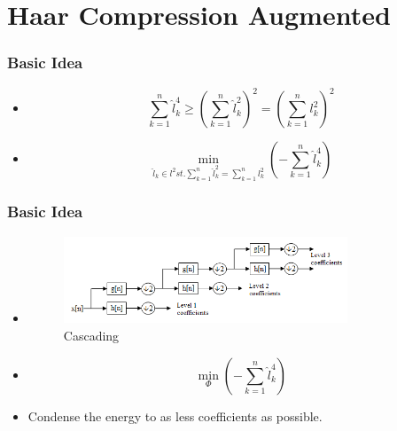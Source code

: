 \documentclass{beamer}
\begin{document}
\section{Haar Compression Augmented}
\begin{frame}
    \frametitle{Basic Idea}
    \begin{itemize}
        \item \[
                  \sum_{k=1}^{n}\hat{l}_k^4
                  \geq
                  (\sum_{k=1}^{n}\hat{l}_k^2)^2
                  =
                  (\sum_{k=1}^{n}l_k^2)^2
              \]
        \item \[
                  \min_{\hat{l}_k\in l^2 st. \sum_{k=1}^{n}\hat{l}_k^2=\sum_{k=1}^{n}l_k^2}(-\sum_{k=1}^{n}\hat{l}_k^4)
              \]
    \end{itemize}
\end{frame}
\begin{frame}
    \frametitle{Basic Idea}
    \begin{itemize}
        \item 	\begin{figure}
                  \centering
                  \includegraphics[width=0.8\textwidth]{fig/Wavelets_-_Filter_Bank.png}
                  \caption{Cascading}
                  \label{fig:Cascading}
              \end{figure}
        \item \[
                  \min_{\Phi}(-\sum_{k=1}^{n}\hat{l}_k^4)
              \]
        \item Condense the energy to as less coefficients as possible.
    \end{itemize}
\end{frame}
\end{document}
